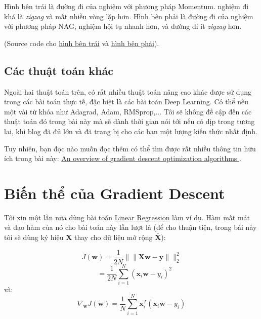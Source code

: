 Hình bên trái là đường đi của nghiệm với phương pháp Momentum. nghiệm đi khá là \textit{zigzag} và mất nhiều vòng lặp hơn. Hình bên phải là đường đi của nghiệm với phương pháp NAG, nghiệm hội tụ nhanh hơn, và đường đi ít \textit{zigzag} hơn.  
 
(Source code cho \href{https://github.com/tiepvupsu/tiepvupsu.github.io/blob/master/assets/GD/LR%20Momentum.ipynb}{hình bên trái} và \href{https://github.com/tiepvupsu/tiepvupsu.github.io/blob/master/assets/GD/LR%20NAG.ipynb}{ hình bên phải}). 
 
 
\subsection{Các thuật toán khác}
Ngoài hai thuật toán trên, có rất nhiều thuật toán nâng cao khác được sử dụng trong các bài toán thực tế, đặc biệt là các bài toán Deep Learning. Có thể nêu một vài từ khóa như Adagrad, Adam, RMSprop,... Tôi sẽ không đề cập đến các thuật toán đó trong bài này mà sẽ dành thời gian nói tới nếu có dịp trong tương lai, khi blog đã đủ lớn và đã trang bị cho các bạn một lượng kiến thức nhất định.  
 
Tuy nhiên, bạn đọc nào muốn đọc thêm có thể tìm được rất nhiều thông tin hữu ích trong bài này: 
\href{http://sebastianruder.com/optimizing-gradient-descent/index.html#stochasticgradientdescent}{An overview of gradient descent optimization algorithms }. 
 
 
\section{Biến thể của Gradient Descent}
Tôi xin một lần nữa dùng bài toán \href{http://machinelearningcoban.com/2016/12/28/linearregression/}{Linear Regression} làm ví dụ. Hàm mất mát và đạo hàm của nó cho bài toán này lần lượt là (để cho thuận tiện, trong bài này tôi sẽ dùng ký hiệu $\mathbf{X}$ thay cho dữ liệu mở rộng $\bar{\mathbf{X}}$): 
 
\begin{equation*} 
J(\mathbf{w}) = \frac{1}{2N}\|\|\mathbf{X}\mathbf{w} - \mathbf{y}\|\|_2^2 
\end{equation*} 
\begin{equation*} 
~~~~ = \frac{1}{2N} \sum_{i=1}^N(\mathbf{x}_i \mathbf{w} - y_i)^2 
\end{equation*} 
và: 
\begin{equation*} 
\nabla_{\mathbf{w}} J(\mathbf{w}) = \frac{1}{N}\sum_{i=1}^N \mathbf{x}_i^T(\mathbf{x}_i\mathbf{w} - y_i) 
\end{equation*} 
 
